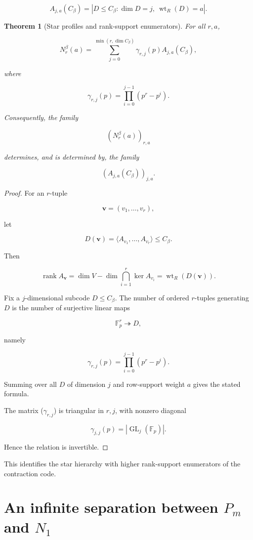 \documentclass[11pt]{article}
\newtheorem{theorem}{Theorem}[section]
\begin{document}
\[
A_{j,a}(C_\beta)=
|{D\le C_\beta:\dim D=j,\ \operatorname{wt}_R(D)=a}|.
\]

\begin{theorem}[Star profiles and rank-support enumerators]

For all $r,a$,

\[
N_r^\beta(a)=
\sum_{j=0}^{\min(r,\dim C_\beta)}
\gamma_{r,j}(p)A_{j,a}(C_\beta),
\]

where

\[
\gamma_{r,j}(p)
=\prod_{i=0}^{j-1}(p^r-p^i).
\]

Consequently, the family

\[
(N_r^\beta(a))_{r,a}
\]

determines, and is determined by, the family

\[
(A_{j,a}(C_\beta))_{j,a}.
\]

\end{theorem}
\begin{proof}

For an $r$-tuple

\[
\mathbf v=(v_1,\dots,v_r),
\]

let

\[
D(\mathbf v)
=\langle A_{v_1},\dots,A_{v_r}\rangle
\le C_\beta.
\]

Then

\[
\operatorname{rank}A_{\mathbf v}
=\dim V-\dim\bigcap_{i=1}^r\ker A_{v_i}
=\operatorname{wt}_R(D(\mathbf v)).
\]

Fix a $j$-dimensional subcode $D\le C_\beta$. The number of ordered $r$-tuples generating $D$ is the number of surjective linear maps

\[
\mathbb F_p^r\twoheadrightarrow D,
\]

namely

\[
\gamma_{r,j}(p)=
\prod_{i=0}^{j-1}(p^r-p^i).
\]

Summing over all $D$ of dimension $j$ and row-support weight $a$ gives the stated formula.

The matrix ($\gamma_{r,j}$) is triangular in $r,j$, with nonzero diagonal

\[
\gamma_{j,j}(p)=|\operatorname{GL}_j(\mathbb F_p)|.
\]

Hence the relation is invertible.
\end{proof}

This identifies the star hierarchy with higher rank-support enumerators of the contraction code.

\section{An infinite separation between $P_m$ and $N_1$}
\end{document}
